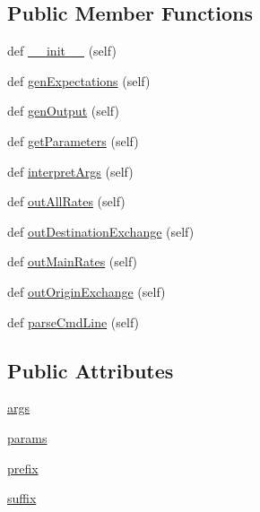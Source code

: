 \subsection*{Public Member Functions}
\begin{DoxyCompactItemize}
\item 
def \hyperlink{classe2e_1_1_application_a2267bd2e8d3114095e6271aed7f8c8c9}{\+\_\+\+\_\+init\+\_\+\+\_\+} (self)
\item 
def \hyperlink{classe2e_1_1_application_a72b854da6d69dbcb5031f24dccf9cc71}{gen\+Expectations} (self)
\item 
def \hyperlink{classe2e_1_1_application_a0f753699fabab3ae17407b36404d3b64}{gen\+Output} (self)
\item 
def \hyperlink{classe2e_1_1_application_ae7bc7b58f19d681635cfa8ae06d9769b}{get\+Parameters} (self)
\item 
def \hyperlink{classe2e_1_1_application_ae7b9559aa388f8178300fb4d7a9f9257}{interpret\+Args} (self)
\item 
def \hyperlink{classe2e_1_1_application_acd7798aa633d75001b6f6fde556b8a51}{out\+All\+Rates} (self)
\item 
def \hyperlink{classe2e_1_1_application_a1b099bee6f8170c4c52e7ae884d95b27}{out\+Destination\+Exchange} (self)
\item 
def \hyperlink{classe2e_1_1_application_a3e33fd00d85637393d48ea3f7dbd95c7}{out\+Main\+Rates} (self)
\item 
def \hyperlink{classe2e_1_1_application_adfad90d64cddb8d751961202264ca489}{out\+Origin\+Exchange} (self)
\item 
def \hyperlink{classe2e_1_1_application_a91b8b6df6456d27bed503849ffcdcc77}{parse\+Cmd\+Line} (self)
\end{DoxyCompactItemize}
\subsection*{Public Attributes}
\begin{DoxyCompactItemize}
\item 
\hyperlink{classe2e_1_1_application_abade6fc2e2c04ddd7e48137a2a7721bd}{args}
\item 
\hyperlink{classe2e_1_1_application_a57206c6ccc86c2659edfd8d73d2029f3}{params}
\item 
\hyperlink{classe2e_1_1_application_a027ff25e5409ae17584978a09fc2611a}{prefix}
\item 
\hyperlink{classe2e_1_1_application_a4d824ad36b051d2d629edb314385df0d}{suffix}
\end{DoxyCompactItemize}


